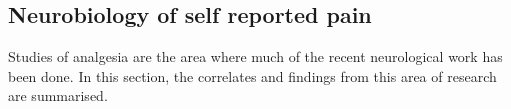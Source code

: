 


\subsection{Neurobiology of self reported pain}
\label{sec:neur-self-report}

Studies of analgesia are the area where much of the recent neurological work has been done. In this section, the correlates and findings from this area of research are summarised. 



